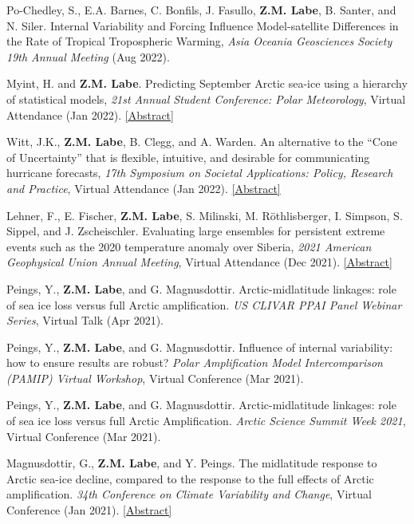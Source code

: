 \documentclass[margin,line,palatino,courier,10pt]{res}
\begin{document}
\begin{resume}
\begin{etaremune}[leftmargin=0in,topsep=0in,parsep=0in]
\item Po-Chedley, S., E.A. Barnes, C. Bonfils, J. Fasullo, \textbf{Z.M. Labe}, B. Santer, and N. Siler. Internal Variability and Forcing Influence Model-satellite Differences in the Rate of Tropical Tropospheric Warming, \textit{Asia Oceania Geosciences Society 19th Annual Meeting} (Aug 2022).
\item Myint, H. and \textbf{Z.M. Labe}. Predicting September Arctic sea-ice using a hierarchy of statistical models, \textit{21st Annual Student Conference: Polar Meteorology}, Virtual Attendance (Jan 2022). \href{https://ams.confex.com/ams/102ANNUAL/meetingapp.cgi/Paper/391367}{[Abstract]}
\item Witt, J.K., \textbf{Z.M. Labe}, B. Clegg, and A. Warden. An alternative to the ``Cone of Uncertainty'' that is flexible, intuitive, and desirable for communicating hurricane forecasts, \textit{17th Symposium on Societal Applications: Policy, Research and Practice}, Virtual Attendance (Jan 2022). \href{https://ams.confex.com/ams/102ANNUAL/meetingapp.cgi/Paper/395666}{[Abstract]}
\item Lehner, F., E. Fischer, \textbf{Z.M. Labe}, S. Milinski, M. R\"{o}thlisberger, I. Simpson, S. Sippel, and J. Zscheischler. Evaluating large ensembles for persistent extreme events such as the 2020 temperature anomaly over Siberia, \textit{2021 American Geophysical Union Annual Meeting}, Virtual Attendance (Dec 2021). \href{https://agu.confex.com/agu/fm21/meetingapp.cgi/Paper/944312}{[Abstract]}
\item Peings, Y., \textbf{Z.M. Labe}, and G. Magnusdottir. Arctic-midlatitude linkages: role of sea ice loss versus full Arctic amplification. \textit{US CLIVAR PPAI Panel Webinar Series}, Virtual Talk (Apr 2021).
\item Peings, Y., \textbf{Z.M. Labe}, and G. Magnusdottir. Influence of internal variability: how to ensure results are robust? \textit{Polar Amplification Model Intercomparison (PAMIP) Virtual Workshop}, Virtual Conference (Mar 2021).
\item Peings, Y., \textbf{Z.M. Labe}, and G. Magnusdottir. Arctic-midlatitude linkages: role of sea ice loss versus full Arctic Amplification. \textit{Arctic Science Summit Week 2021}, Virtual Conference (Mar 2021).
\item Magnusdottir, G., \textbf{Z.M. Labe}, and Y. Peings. The midlatitude response to Arctic sea-ice decline, compared to the response to the full effects of Arctic amplification. \textit{34th Conference on Climate Variability and Change}, Virtual Conference (Jan 2021). \href{https://ams.confex.com/ams/101ANNUAL/meetingapp.cgi/Paper/382356}{[Abstract]}

\end{etaremune}
\end{resume}
\end{document}
